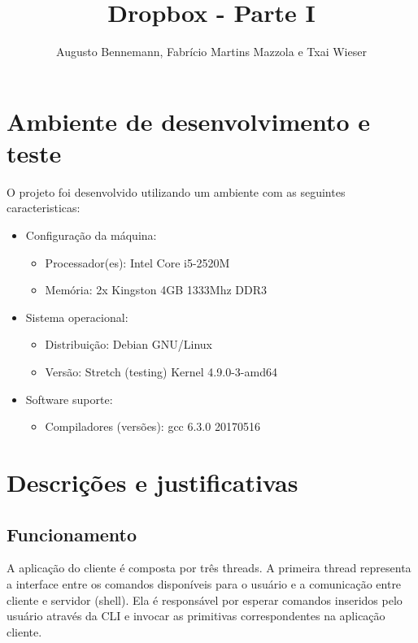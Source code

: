 \documentclass[a4paper]{article}
\title{Dropbox - Parte I}
\author{Augusto Bennemann, Fabrício Martins Mazzola e Txai Wieser}
\date{}
\begin{document}
\maketitle


\section{Ambiente de desenvolvimento e teste}

O projeto foi desenvolvido utilizando um ambiente com as seguintes caracteristicas:
\begin{itemize}
	\item Configuração da máquina:
	\begin{itemize}
		\item Processador(es): Intel Core i5-2520M
		\item Memória: 2x Kingston 4GB 1333Mhz DDR3
	\end{itemize}

	\item{Sistema operacional}: 
	\begin{itemize}
		\item Distribuição: Debian GNU/Linux 
		\item Versão: Stretch (testing) Kernel 4.9.0-3-amd64
	\end{itemize}

	\item Software suporte:
	\begin{itemize}
		\item Compiladores (versões): gcc 6.3.0 20170516
	\end{itemize}
\end{itemize}

\section{Descrições e justificativas}

\subsection{Funcionamento}

A aplicação do cliente é composta por três threads. A primeira thread representa a interface entre os comandos disponíveis para o usuário e a comunicação entre cliente e servidor (shell). Ela é responsável por esperar comandos inseridos pelo usuário através da CLI e invocar as primitivas correspondentes na aplicação cliente. 
\end{document}
